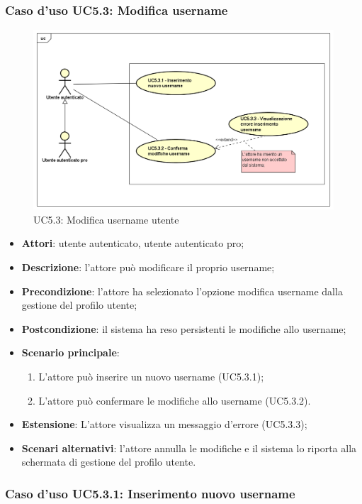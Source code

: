 \subsubsection{Caso d'uso UC5.3: Modifica username}
\label{UC5.3}
\begin{figure}[h]
	\centering
	\includegraphics[scale=0.5,keepaspectratio]{UML/UC5_3.png}
	\caption{UC5.3: Modifica username utente}
\end{figure}
\begin{itemize}
	\item \textbf{Attori}: utente autenticato, utente autenticato pro;
	\item \textbf{Descrizione}: l'attore può modificare il proprio username;
	\item \textbf{Precondizione}: l'attore ha selezionato l'opzione modifica username dalla gestione del profilo utente; 
	\item \textbf{Postcondizione}: il sistema ha reso persistenti le modifiche allo username;
	\item \textbf{Scenario principale}:
	\begin{enumerate}
		\item L'attore può inserire un nuovo username (UC5.3.1);
		\item L'attore può confermare le modifiche allo username (UC5.3.2).
	\end{enumerate}
	\item \textbf{Estensione}: L'attore visualizza un messaggio d'errore (UC5.3.3);
	\item \textbf{Scenari alternativi}: l'attore annulla le modifiche e il sistema lo riporta alla schermata di gestione del profilo utente.
\end{itemize}

\subsubsection{Caso d'uso UC5.3.1: Inserimento nuovo username}

